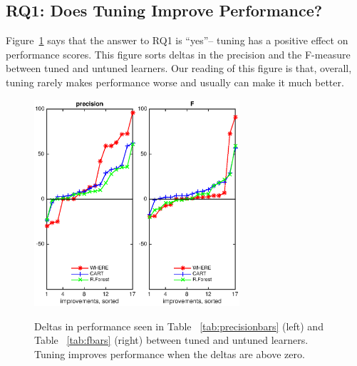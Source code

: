 \documentclass{sig-alternative}
\newcommand{\fig}[1]{Figure~\ref{fig:#1}}
\newcommand{\tab}[1]{Table ~\ref{tab:#1}}
\begin{document}
\subsection{RQ1:  Does  Tuning  Improve Performance? }\label{sect:precision}


\fig{deltas} says  that the answer to RQ1 is ``yes''-- tuning  has a positive effect on performance scores. This figure sorts
 deltas in the precision and the F-measure    between tuned and untuned learners. Our reading of this
figure is that, overall, tuning rarely makes performance   worse and usually can make it much better. 
 

\begin{figure}[!t]
\begin{center}
\includegraphics[width=1.5in]{precision_W.eps}\includegraphics[width=1.5in]{F_W.eps}
 \end{center}
\caption{Deltas in performance  seen in \tab{precisionbars} (left)
and \tab{fbars} (right) between tuned and untuned learners. Tuning improves performance when the deltas are above zero.}\label{fig:deltas}
 \end{figure}
 
\end{document}
